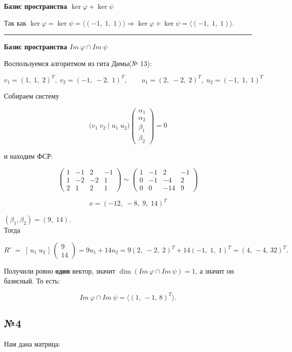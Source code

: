 \documentclass[11pt]{article}
\begin{document}
\textbf{Базис пространства $\ker\varphi + \ker\psi$}

Так как $\ker \varphi = \ker \psi = \langle (-1, \; 1, \; 1) \rangle \Rightarrow \ker \varphi + \ker \psi = \langle (-1, \; 1, \; 1) \rangle$.

\noindent\rule{\textwidth}{0.5pt}

\textbf{Базис пространства $Im \ \varphi\cap Im \ \psi$}

Воспользуемся алгоритмом из гита Димы(№ 13):

$$
v_1 = (1, \; 1, \; 2)^T,\; v_2 = (-1, \; -2, \; 1)^T,
\qquad
u_1 = (2, \; -2, \; 2)^T,\; u_2 = (-1, \; 1, \; 1)^T
$$

Собираем систему

$$
\bigl(v_1\;v_2\;|\;u_1\;u_2\bigr)
\begin{pmatrix}
\alpha_1 \\
\alpha_2 \\
\beta_1 \\
\beta_2
\end{pmatrix}
= 0
$$

и находим ФСР:

$$
\begin{pmatrix}
1 & -1 & 2 & -1\\
1 & -2 & -2 & 1\\
2 & 1 & 2 & 1
\end{pmatrix} \sim
\begin{pmatrix}
1 & -1 & 2 & -1 \\
0 & -1 & -4 & 2 \\
0 & 0 & -14 & 9
\end{pmatrix}
$$

$$
x = (-12, \; -8, \; 9, \; 14)^T
$$

$(\beta_1,\beta_2)=(9 ,\; 14)$.\\
Тогда

$$
R' \;=\; [\,u_1\;u_2\,]\,
\begin{pmatrix}
9\\
14
\end{pmatrix}
= 9u_1 + 14u_2
= 9(2, \; -2, \; 2)^T + 14(-1, \; 1, \; 1)^T
= (4, \, -4, \, 32)^T.
$$

Получили ровно \textbf{один} вектор, значит $\dim(Im \ \varphi \cap Im \ \psi)=1$, а значит он базисный. То есть:

$$
Im \ \varphi \cap Im \ \psi= \langle (1, \, -1, \, 8)^T \rangle.
$$

\subsection*{№4}
Нам дана матрица:
\end{document}
